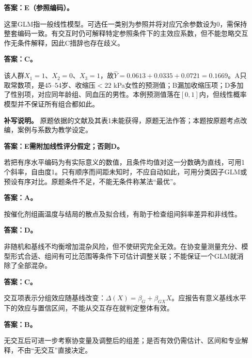 
\textbf{答案：E（参照编码）。}

这里GLM指一般线性模型。可选任一类别为参照并将对应冗余参数设为0，需保持整套编码一致。有交互时仍可解释特定参照条件下的主效应系数，但不能忽略交互作无条件解释，因此C措辞也存在歧义。



\textbf{答案：C。}

该人群\(X_1=1\)、\(X_2=0\)、\(X_3=1\)，故\(\hat Y=0.0613+0.0335+0.0721=0.1669\)。A只取常数项，是45--54岁、收缩压\(<22\) kPa女性的预测值；B漏加收缩压项；D多加了性别项，对应同年龄组、同血压的男性。本例预测值落在\([0,1]\)内，但线性概率模型并不保证所有组合都如此。

\textbf{补写说明。} 原题依据的文献及其表1未能获得，原题无法作答；本题按原题考点改编，案例与系数为教学设定。



\textbf{答案：E需附加线性评分假定；否则D。}

若把有序水平编码为有实际意义的数值，且条件均值对这一分数确为直线，可用1个斜率，自由度1。只有顺序而间距未知时，不应自动如此，可用分类因子GLM或预设有序对比。原题条件不足，不能无条件称某法``最优''。



\textbf{答案：A。}

按催化剂组画温度与结局的散点及拟合线，有助于检查组间斜率差异和非线性。



\textbf{答案：D。}

非随机和基线不均衡增加混杂风险，但不使研究完全无效。在协变量测量充分、模型形式合适、组间有可比范围等条件下可估计调整关联；不能保证一个GLM就消除了全部混杂。



\textbf{答案：C。}

交互项表示分组效应随基线改变：\(\Delta(X)=\beta_G+\beta_{GX}X\)。应报告有意义基线水平下的效应与置信区间，不能从交互存在就判定整体有效。



\textbf{答案：B。}

无交互后可进一步考察协变量及调整后的组差；是否有效仍需估计、区间和专业解释，不由``无交互''直接决定。



